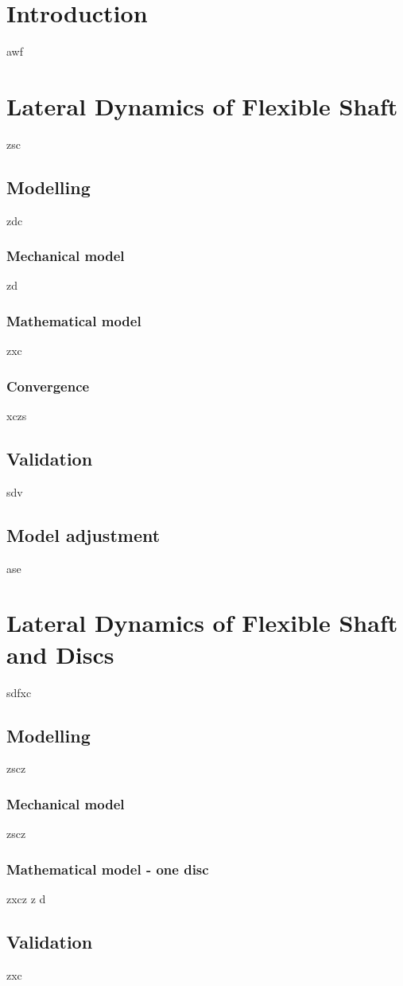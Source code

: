 \section{Introduction}
awf
\section{Lateral Dynamics of Flexible Shaft}
zsc
\subsection{Modelling}
zdc
\subsubsection{Mechanical model}
zd
\subsubsection{Mathematical model}
zxc
\subsubsection{Convergence}
xczs
\subsection{Validation}
sdv
\subsection{Model adjustment}
ase
\section{Lateral Dynamics of Flexible Shaft and Discs}
sdfxc
\subsection{Modelling}
zscz
\subsubsection{Mechanical model}
zscz
\subsubsection{Mathematical model - one disc}
zxcz
z d
\subsection{Validation}
zxc
